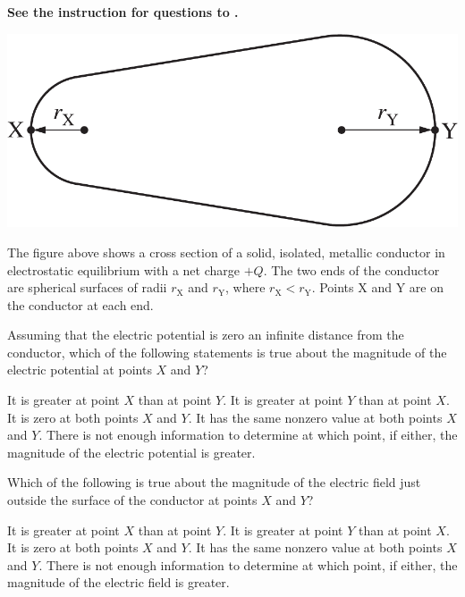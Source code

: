 
\textbf{See the instruction for questions  to .} 

\begin{center}
    \includegraphics[scale=0.3]{images/img-006-006.png}
\end{center}

The figure above shows a cross section of a solid, isolated, metallic conductor in electrostatic equilibrium with a net charge $+Q$. The two ends of the conductor are spherical surfaces of radii $r_{\mathrm{X}}$ and $r_{\mathrm{Y}}$, where $r_{\mathrm{X}}<r_{\mathrm{Y}}$. Points $\mathrm{X}$ and $\mathrm{Y}$ are on the conductor at each end.

\begin{questions}
\setcounter{question}{8}

\question
Assuming that the electric potential is zero an infinite distance from the conductor, which of the following statements is true about the magnitude of the electric potential at points $X$ and $Y$?

\begin{choices}
    \choice It is greater at point $X$ than at point $Y$.
    \choice It is greater at point $Y$ than at point $X$.
    \choice It is zero at both points $X$ and $Y$.
    \choice It has the same nonzero value at both points $X$ and $Y$.
    \choice There is not enough information to determine at which point, if either, the magnitude of the electric potential is greater.
\end{choices}

\question
Which of the following is true about the magnitude of the electric field just outside the surface of the conductor at points $X$ and $Y$?

\begin{choices}
    \choice It is greater at point $X$ than at point $Y$.
    \choice It is greater at point $Y$ than at point $X$.
    \choice It is zero at both points $X$ and $Y$.
    \choice It has the same nonzero value at both points $X$ and $Y$.
    \choice There is not enough information to determine at which point, if either, the magnitude of the electric field is greater.
\end{choices}

\end{questions}
